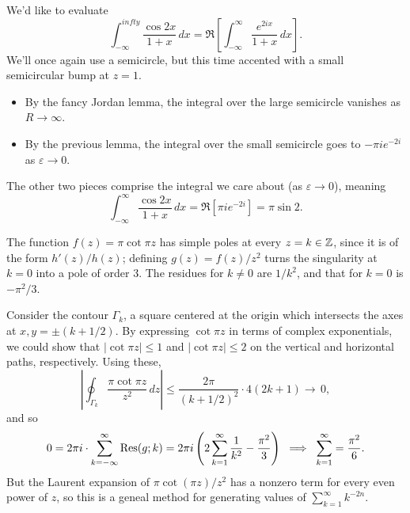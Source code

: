 \documentclass[../m136main.tex]{subfiles}
\begin{document}
\begin{example}
    We'd like to evaluate
    \[ \int_{-\infty}^{infty} \frac{\cos 2x}{1 + x} \,dx = \Re \left[ \int_{-\infty}^{\infty} \frac{e^{2ix}}{1 + x} \,dx \right]. \]
    We'll once again use a semicircle, but this time accented with a small semicircular bump at $z=1$.
    \begin{itemize}[topsep=0pt]
        \item By the fancy Jordan lemma, the integral over the large semicircle vanishes as $R \to \infty$.
        \item By the previous lemma, the integral over the small semicircle goes to $-\pi i e^{-2i}$ as $\varepsilon \to 0$.
    \end{itemize}
    The other two pieces comprise the integral we care about (as $\varepsilon \to 0$), meaning
    \[ \int_{-\infty}^{\infty} \frac{\cos 2x}{1 + x} \,dx = \Re \left[ \pi i e^{-2i} \right] = \pi \sin 2. \]
\end{example}

\begin{example}
    The function $f(z) = \pi \cot \pi z$ has simple poles at every $z = k \in \mathbb{Z}$, since it is of the form $h'(z) / h(z)$; defining $g(z) = f(z) / z^2$ turns the singularity at $k=0$ into a pole of order 3.
    The residues for $k \neq 0$ are $1 / k^2$, and that for $k = 0$ is $-\pi^2 / 3$.

    Consider the contour $\Gamma_k$, a square centered at the origin which intersects the axes at $x,y = \pm (k + 1 / 2)$.
    By expressing $\cot \pi z$ in terms of complex exponentials, we could show that
    $|\cot \pi z| \leq 1$ and $|\cot \pi z| \leq 2$ on the vertical and horizontal paths, respectively.
    Using these,
    \[ \left| \oint_{\Gamma_k} \frac{\pi \cot \pi z}{z^2} \,dz \right| \leq \frac{2\pi}{(k + 1 / 2)^2} \cdot 4(2k + 1) \longrightarrow \, 0, \]
    and so
    \[ 0 = 2\pi i \cdot \sum_{k=-\infty}^{\infty} \operatorname{Res}(g; k) = 2\pi i \left( 2 \sum_{k=1}^{\infty} \frac{1}{k^2} - \frac{\pi^2}{3} \right) \;\implies\; \sum_{k=1}^{\infty} = \frac{\pi^2}{6}. \]
    But the Laurent expansion of $\pi \cot (\pi z) / z^2$ has a nonzero term for every even power of $z$, so this is a geneal method for generating values of $\sum_{k=1}^{\infty} k^{-2n}$.
\end{example}
\end{document}
